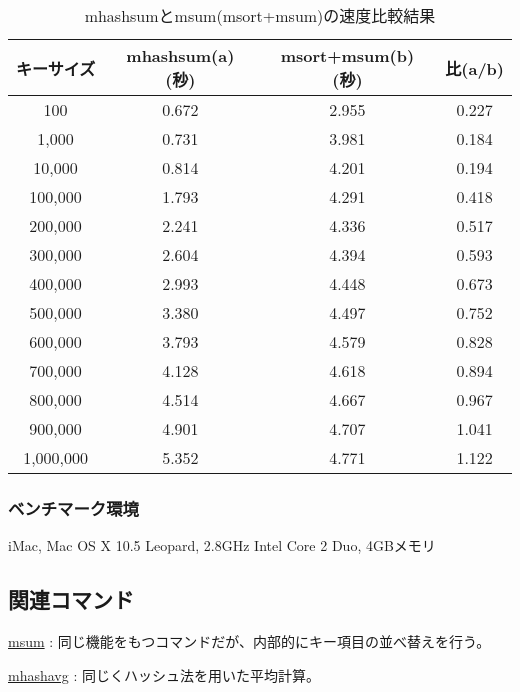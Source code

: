 \begin{table}[hbt]
\begin{center}
\caption{mhashsumとmsum(msort+msum)の速度比較結果\label{tbl:mhashsum_exp}}
\begin{tabular}{c|c|c|c}
\hline
キーサイズ&mhashsum(a)(秒)&msort+msum(b)(秒)&比(a/b)\\ \hline
100&0.672&2.955&0.227\\
1,000&0.731&3.981&0.184\\
10,000&0.814&4.201&0.194\\
100,000&1.793&4.291&0.418\\
200,000&2.241&4.336&0.517\\
300,000&2.604&4.394&0.593\\
400,000&2.993&4.448&0.673\\
500,000&3.380&4.497&0.752\\
600,000&3.793&4.579&0.828\\
700,000&4.128&4.618&0.894\\
800,000&4.514&4.667&0.967\\
900,000&4.901&4.707&1.041\\
1,000,000&5.352&4.771&1.122\\ \hline
\end{tabular}
\end{center}
\end{table}

\subsubsection*{ベンチマーク環境}

iMac, Mac OS X 10.5 Leopard, 2.8GHz Intel Core 2 Duo, 4GBメモリ

\subsection*{関連コマンド}
\hyperref[sect:msum] {msum} : 同じ機能をもつコマンドだが、内部的にキー項目の並べ替えを行う。

\hyperref[sect:mhashavg]{mhashavg} : 同じくハッシュ法を用いた平均計算。

%
